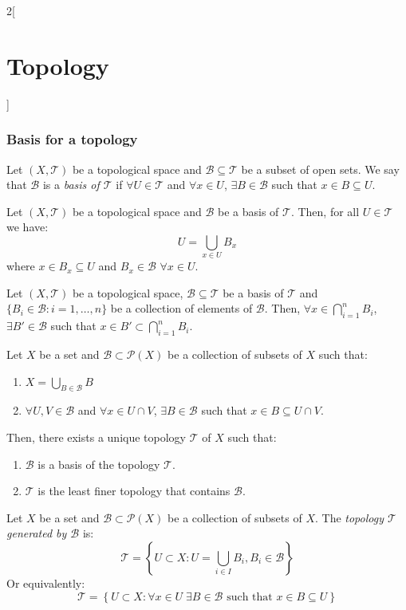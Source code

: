 \documentclass[../../../main.tex]{subfiles}
\begin{document}
\begin{multicols}{2}[\section{Topology}]
  \subsubsection{Basis for a topology}
  \begin{definition}
    Let $(X,\mathcal{T})$ be a topological space and $\mathcal{B}\subseteq\mathcal{T}$ be a subset of open sets. We say that $\mathcal{B}$ is a \textit{basis of $\mathcal{T}$} if $\forall U\in\mathcal{T}$ and $\forall x\in U$, $\exists B\in\mathcal{B}$ such that $x\in B\subseteq U$.
  \end{definition}
  \begin{prop}
    Let $(X,\mathcal{T})$ be a topological space and $\mathcal{B}$ be a basis of $\mathcal{T}$. Then, for all $U\in\mathcal{T}$ we have: $$U=\bigcup_{x\in U}B_x$$ where $x\in B_x\subseteq U$ and $B_x\in\mathcal{B}$ $\forall x\in U$.
  \end{prop}
  \begin{lemma}
    Let $(X,\mathcal{T})$ be a topological space, $\mathcal{B}\subseteq\mathcal{T}$ be a basis of $\mathcal{T}$ and $\{B_i\in\mathcal{B}:i=1,\ldots,n\}$ be a collection of elements of $\mathcal{B}$. Then, $\forall x\in\bigcap_{i=1}^nB_i$, $\exists B'\in\mathcal{B}$ such that $x\in B'\subset\bigcap_{i=1}^nB_i$.
  \end{lemma}
  \begin{prop}
    Let $X$ be a set and $\mathcal{B}\subset\mathcal{P}(X)$ be a collection of subsets of $X$ such that:
    \begin{enumerate}
      \renewcommand{\labelenumi}{\alph{enumi})}
      \item $\displaystyle X=\bigcup_{B\in\mathcal{B}} B$
      \item $\forall U,V\in\mathcal{B}$ and  $\forall x\in U\cap V$, $\exists B\in\mathcal{B}$ such that $x\in B\subseteq U\cap V$.
    \end{enumerate}
    Then, there exists a unique topology $\mathcal{T}$ of $X$ such that:
    \begin{enumerate}
      \item $\mathcal{B}$ is a basis of the topology $\mathcal{T}$.
      \item $\mathcal{T}$ is the least finer topology that contains $\mathcal{B}$.
    \end{enumerate}
  \end{prop}
  \begin{definition}
    Let $X$ be a set and $\mathcal{B}\subset\mathcal{P}(X)$ be a collection of subsets of $X$. The \textit{topology $\mathcal{T}$ generated by $\mathcal{B}$} is: $$\mathcal{T}=\left\{U\subset X:U=\bigcup_{i\in I}B_i, B_i\in \mathcal{B}\right\}$$ Or equivalently: $$\mathcal{T}=\left\{U\subset X:\forall x\in U\;\exists B\in\mathcal{B}\text{ such that }x\in B\subseteq U\right\}$$

\end{definition}
\end{multicols}
\end{document}
